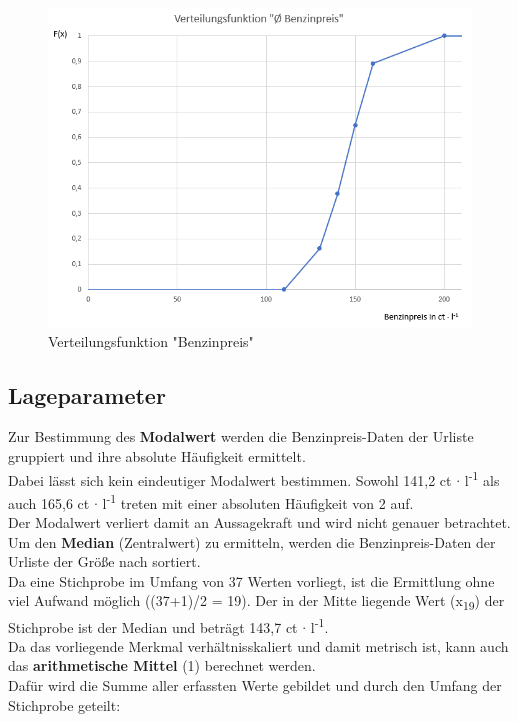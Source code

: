 \begin{figure}[H]
  \centering
  \includegraphics[width = \textwidth]{graphics/verteilungsfunktion.png}
  \caption{Verteilungsfunktion "Benzinpreis"}
  \label{fig:vertBenzUni}
\end{figure}


\subsection{Lageparameter}
Zur Bestimmung des \textbf{Modalwert} werden die Benzinpreis-Daten der Urliste gruppiert und ihre absolute Häufigkeit ermittelt.\\
Dabei lässt sich kein eindeutiger Modalwert bestimmen. Sowohl 141,2 ct $\cdot$ l\textsuperscript{-1} als auch 165,6 ct $\cdot$ l\textsuperscript{-1} treten mit einer absoluten Häufigkeit von 2 auf.\\
Der Modalwert verliert damit an Aussagekraft und wird nicht genauer betrachtet.\\

Um den \textbf{Median} (Zentralwert) zu ermitteln, werden die Benzinpreis-Daten der Urliste der Größe nach sortiert.\\
Da eine Stichprobe im Umfang von 37 Werten vorliegt, ist die Ermittlung ohne viel Aufwand möglich ((37+1)/2 = 19).
Der in der Mitte liegende Wert (x\textsubscript{19}) der Stichprobe ist der Median und beträgt 143,7 ct $\cdot$ l\textsuperscript{-1}.\\

Da das vorliegende Merkmal verhältnisskaliert und damit metrisch ist, kann auch das \textbf{arithmetische Mittel} (1) berechnet werden.\\
Dafür wird die Summe aller erfassten Werte gebildet und durch den Umfang der Stichprobe geteilt:


